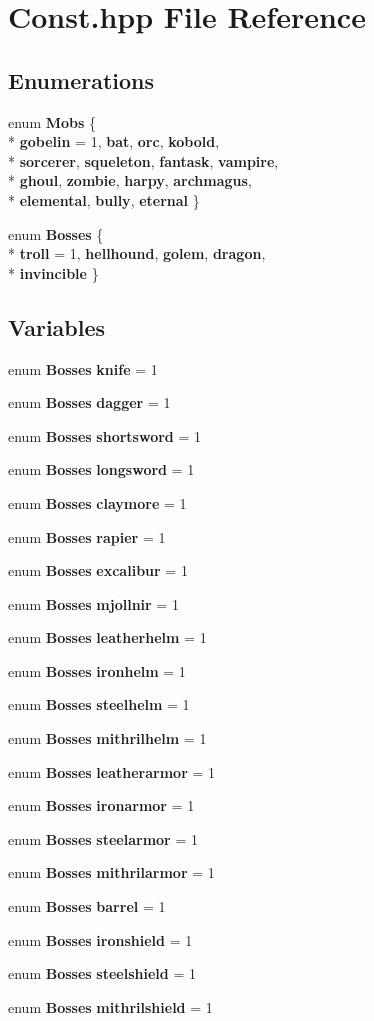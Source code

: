 \section{Const.\-hpp File Reference}
\label{_const_8hpp}
\subsection*{Enumerations}
\begin{DoxyCompactItemize}
\item 
enum {\bf Mobs} \{ \\*
{\bf gobelin} = 1, 
{\bf bat}, 
{\bf orc}, 
{\bf kobold}, 
\\*
{\bf sorcerer}, 
{\bf squeleton}, 
{\bf fantask}, 
{\bf vampire}, 
\\*
{\bf ghoul}, 
{\bf zombie}, 
{\bf harpy}, 
{\bf archmagus}, 
\\*
{\bf elemental}, 
{\bf bully}, 
{\bf eternal}
 \}
\item 
enum {\bf Bosses} \{ \\*
{\bf troll} = 1, 
{\bf hellhound}, 
{\bf golem}, 
{\bf dragon}, 
\\*
{\bf invincible}
 \}
\end{DoxyCompactItemize}
\subsection*{Variables}
\begin{DoxyCompactItemize}
\item 
enum {\bf Bosses} {\bf knife} = 1
\item 
enum {\bf Bosses} {\bf dagger} = 1
\item 
enum {\bf Bosses} {\bf shortsword} = 1
\item 
enum {\bf Bosses} {\bf longsword} = 1
\item 
enum {\bf Bosses} {\bf claymore} = 1
\item 
enum {\bf Bosses} {\bf rapier} = 1
\item 
enum {\bf Bosses} {\bf excalibur} = 1
\item 
enum {\bf Bosses} {\bf mjollnir} = 1
\item 
enum {\bf Bosses} {\bf leatherhelm} = 1
\item 
enum {\bf Bosses} {\bf ironhelm} = 1
\item 
enum {\bf Bosses} {\bf steelhelm} = 1
\item 
enum {\bf Bosses} {\bf mithrilhelm} = 1
\item 
enum {\bf Bosses} {\bf leatherarmor} = 1
\item 
enum {\bf Bosses} {\bf ironarmor} = 1
\item 
enum {\bf Bosses} {\bf steelarmor} = 1
\item 
enum {\bf Bosses} {\bf mithrilarmor} = 1
\item 
enum {\bf Bosses} {\bf barrel} = 1
\item 
enum {\bf Bosses} {\bf ironshield} = 1
\item 
enum {\bf Bosses} {\bf steelshield} = 1
\item 
enum {\bf Bosses} {\bf mithrilshield} = 1
\end{DoxyCompactItemize}


